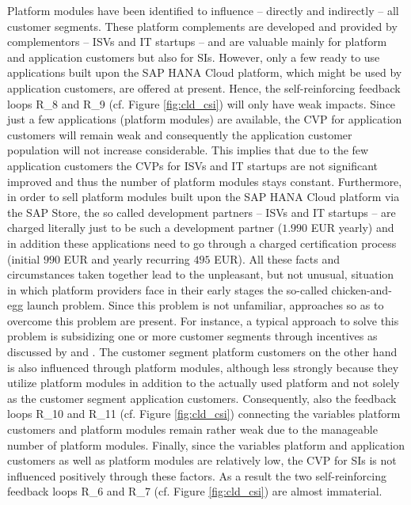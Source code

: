 Platform modules have been identified to influence -- directly and indirectly -- all customer segments. These platform complements are developed and provided by complementors -- \acp{ISV} and \ac{IT} startups -- and are valuable mainly for platform and application customers but also for \acp{SI}. However, only a few ready to use applications built upon the SAP HANA Cloud platform, which might be used by application customers, are offered at present. Hence, the self-reinforcing feedback loops R\_8 and R\_9 (cf. Figure \ref{fig:cld_csi}) will only have weak impacts. Since just a few applications (platform modules) are available, the \ac{CVP} for application customers will remain weak and consequently the application customer population will not increase considerable. This implies that due to the few application customers the \acp{CVP} for \acp{ISV} and \ac{IT} startups are not significant improved and thus the number of platform modules stays constant. Furthermore, in order to sell platform modules built upon the SAP HANA Cloud platform via the SAP Store, the so called development partners -- \acp{ISV} and \ac{IT} startups -- are charged literally just to be such a development partner ($1.990$ \ac{EUR} yearly) and in addition these applications need to go through a charged certification process (initial $990$ \ac{EUR} and yearly recurring $495$ \ac{EUR}). All these facts and circumstances taken together lead to the unpleasant, but not unusual, situation in which platform providers face in their early stages the so-called chicken-and-egg launch problem. Since this problem is not unfamiliar, approaches so as to overcome this problem are present. For instance, a typical approach to solve this problem is subsidizing one or more customer segments through incentives as discussed by \citet[pp. 1,5]{Eisenmann2006} and \citet[pp. 195-196]{Evans2003}. The customer segment platform customers on the other hand is also influenced through platform modules, although less strongly because they utilize platform modules in addition to the actually used platform and not solely as the customer segment application customers. Consequently, also the feedback loops R\_10 and R\_11 (cf. Figure \ref{fig:cld_csi}) connecting the variables platform customers and platform modules remain rather weak due to the manageable number of platform modules. Finally, since the variables platform and application customers as well as platform modules are relatively low, the \ac{CVP} for \acp{SI} is not influenced positively through these factors. As a result the two self-reinforcing feedback loops R\_6 and R\_7 (cf. Figure \ref{fig:cld_csi}) are almost immaterial.

